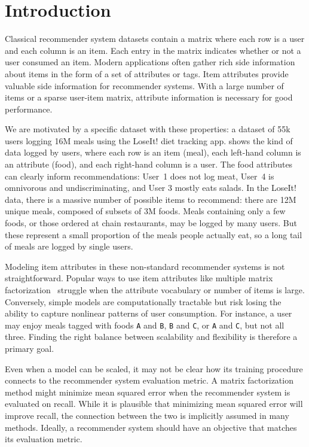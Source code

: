 \section{Introduction}\label{sec:rfs-introduction}

Classical recommender system datasets contain a matrix where each row is a user and each column is an item. Each entry in the matrix indicates whether or not a user consumed an item. Modern applications often gather rich side information about items in the form of a set of attributes or tags. Item attributes provide valuable side information for recommender systems. With a large number of items or a sparse user-item matrix, attribute information is necessary for good performance.

We are motivated by a specific dataset with these properties: a dataset of 55k users logging 16M meals using the LoseIt! diet tracking app.  shows the kind of data logged by users, where each row is an item (meal), each left-hand column is an attribute (food), and each right-hand column is a user. The food attributes can clearly inform recommendations: User~1 does not log meat, User~4 is omnivorous and undiscriminating, and User 3 mostly eats salads. In the LoseIt! data, there is a massive number of possible items to recommend: there are 12M unique meals, composed of subsets of 3M foods. Meals containing only a few foods, or those ordered at chain restaurants, may be logged by many users. But these represent a small proportion of the meals people actually eat, so a long tail of meals are logged by single users.

Modeling item attributes in these non-standard recommender systems is not straightforward. Popular ways to use item attributes like multiple matrix factorization~\citep{wang2011collaborative,gopalan2014content-based} struggle when the attribute vocabulary or number of items is large. Conversely, simple models are computationally tractable but risk losing the ability to capture nonlinear patterns of user consumption. For instance, a user may enjoy meals tagged with foods \texttt{A} and \texttt{B}, \texttt{B} and \texttt{C}, or \texttt{A} and \texttt{C}, but not all three. Finding the right balance between scalability and flexibility is therefore a primary goal.

Even when a model can be scaled, it may not be clear how its training procedure
connects to the recommender system evaluation metric.
A matrix factorization method might minimize mean squared error when the recommender
system is evaluated on recall. While it is plausible that minimizing mean squared error will
improve recall, the connection between the two is implicitly assumed in many methods. Ideally, a recommender system should have an objective that matches its evaluation metric.

